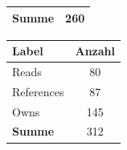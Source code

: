 \begin{table}[htb]
\begin{subtable}[c]{0.3\textwidth}
\begin{tabular}{|l|c|}
                \hline
                \textbf{Summe}  & 260                                  \\ \hline
            \end{tabular}
            \label{table:findingsNewsFiguresContentNodesByClass}
        \end{subtable}
        \begin{subtable}[c]{0.3\textwidth}
            \centering
            \begin{tabular}{|l|c|}
                \hline
                \textbf{Label} & \multicolumn{1}{l|}{\textbf{Anzahl}} \\ \hline
                Reads          & 80                                   \\ \hline
                References     & 87                                   \\ \hline
                Owns           & 145                                  \\ \hline
                \hline
                \textbf{Summe} & 312                                  \\ \hline
                \end{tabular}
            \label{table:findingNewsFiguresEdgesByLabel}
        \end{subtable}


\end{table}
